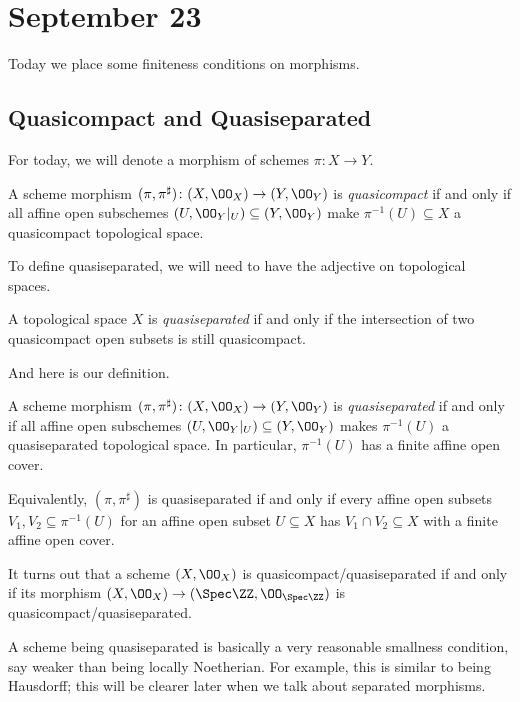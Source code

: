 \documentclass[../notes.tex]{subfiles}
\begin{document}
\section{September 23}

Today we place some finiteness conditions on morphisms.

\subsection{Quasicompact and Quasiseparated}
For today, we will denote a morphism of schemes $\pi\colon X\to Y$.
\begin{definition}[Quasicompact]
	A scheme morphism $(\pi,\pi^\sharp)\colon(X,\OO_X)\to(Y,\OO_Y)$ is \textit{quasicompact} if and only if all affine open subschemes $(U,\OO_Y|_U)\subseteq(Y,\OO_Y)$ make $\pi^{-1}(U)\subseteq X$ a quasicompact topological space.
\end{definition}
To define quasiseparated, we will need to have the adjective on topological spaces.
\begin{definition}[Quasiseperated]
	A topological space $X$ is \textit{quasiseparated} if and only if the intersection of two quasicompact open subsets is still quasicompact.
\end{definition}
And here is our definition.
\begin{defi}[Quasiseparated]
	A scheme morphism $(\pi,\pi^\sharp)\colon(X,\OO_X)\to(Y,\OO_Y)$ is \textit{quasiseparated} if and only if all affine open subschemes $(U,\OO_Y|_U)\subseteq(Y,\OO_Y)$ makes $\pi^{-1}(U)$ a quasiseparated topological space. In particular, $\pi^{-1}(U)$ has a finite affine open cover.
\end{defi}
\begin{remark}
	Equivalently, $(\pi,\pi^\sharp)$ is quasiseparated if and only if every affine open subsets $V_1,V_2\subseteq\pi^{-1}(U)$ for an affine open subset $U\subseteq X$ has $V_1\cap V_2\subseteq X$ with a finite affine open cover.
\end{remark}
It turns out that a scheme $(X,\OO_X)$ is quasicompact/quasiseparated if and only if its morphism $(X,\OO_X)\to(\Spec\ZZ,\OO_{\Spec\ZZ})$ is quasicompact/quasiseparated.
\begin{remark}
	A scheme being quasiseparated is basically a very reasonable smallness condition, say weaker than being locally Noetherian. For example, this is similar to being Hausdorff; this will be clearer later when we talk about separated morphisms.
\end{remark}
\end{document}
